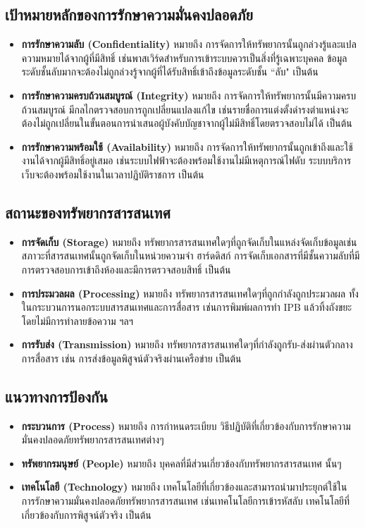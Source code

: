 \documentclass[../th_cyber_warfare_distilled.tex]{subfiles}
\begin{document}
\subsection{เป้าหมายหลักของการรักษาความมั่นคงปลอดภัย}
\begin{itemize}
	\item \textbf{การรักษาความลับ (Confidentiality)} หมายถึง การจัดการให้ทรัพยากรนั้นถูกล่วงรู้และแปลความหมายได้จากผู้ที่มีสิทธิ์ เช่นพาสเวิร์ดสำหรับการเข้าระบบควรเป็นสิ่งที่รู้เฉพาะบุคคล ข้อมูลระดับชั้นลับมากจะต้องไม่ถูกล่วงรู้จากผู้ที่ได้รับสิทธิ์เข้าถึงข้อมูลระดับชั้น ``ลับ" เป็นต้น
	\item \textbf{การรักษาความครบถ้วนสมบูรณ์ (Integrity)} หมายถึง การจัดการให้ทรัพยากรนั้นมีความครบถ้วนสมบูรณ์ มีกลไกตรวจสอบการถูกเปลี่ยนแปลงแก้ไข เช่นรายชื่อการแต่งตั้งดำรงตำแหน่งจะต้องไม่ถูกเปลี่ยนในขั้นตอนการนำเสนอผู้บังคับบัญชาจากผู้ไม่มีสิทธิ์โดยตรวจสอบไม่ได้ เป็นต้น
	\item \textbf{การรักษาความพร้อมใช้ (Availability)} หมายถึง การจัดการให้ทรัพยากรนั้นถูกเข้าถึงและใช้งานได้จากผู้มีสิทธิ์อยู่เสมอ เช่นระบบไฟฟ้าจะต้องพร้อมใช้งานไม่มีเหตุการณ์ไฟดับ ระบบบริการเว็บจะต้องพร้อมใช้งานในเวลาปฏิบัติราชการ เป็นต้น
\end{itemize}

\subsection{สถานะของทรัพยากรสารสนเทศ}
\begin{itemize}
	\item \textbf{การจัดเก็บ (Storage)} หมายถึง ทรัพยากรสารสนเทศใดๆที่ถูกจัดเก็บในแหล่งจัดเก็บข้อมูลเช่นสภาวะที่สารสนเทศนั้นถูกจัดเก็บในหน่วยความจำ ฮาร์ดดิสก์ การจัดเก็บเอกสารที่มีชั้นความลับที่มีการตรวจสอบการเข้าถึงห้องและมีการตรวจสอบสิทธิ์ เป็นต้น
	\item \textbf{การประมวลผล (Processing)} หมายถึง ทรัพยากรสารสนเทศใดๆที่ถูกกำลังถูกประมวลผล ทั้งในกระบวนการนอกระบบสารสนเทศและการสื่อสาร เช่นการพิมพ์ผลการทำ IPB แล้วทิ้งถังขยะโดยไม่มีการทำลายข้อความ ฯลฯ
	\item \textbf{การรับส่ง (Transmission)} หมายถึง ทรัพยากรสารสนเทศใดๆที่กำลังถูกรับ-ส่งผ่านตัวกลางการสื่อสาร เช่น การส่งข้อมูลพิสูจน์ตัวจริงผ่านเครือข่าย เป็นต้น
\end{itemize}

\subsection{แนวทางการป้องกัน}
\begin{itemize}
	\item \textbf{กระบวนการ (Process)} หมายถึง การกำหนดระเบียบ วิธีปฏิบัติที่เกี่ยวข้องกับการรักษาความมั่นคงปลอดภัยทรัพยากรสารสนเทศต่างๆ
	\item \textbf{ทรัพยากรมนุษย์ (People)} หมายถึง บุคคลที่มีส่วนเกี่ยวข้องกับทรัพยากรสารสนเทศ นั้นๆ
	\item \textbf{เทคโนโลยี (Technology)} หมายถึง เทคโนโลยีที่เกี่ยวข้องและสามารถนำมาประยุกต์ใช้ในการรักษาความมั่นคงปลอดภัยทรัพยากรสารสนเทศ เช่นเทคโนโลยีการเข้ารหัสลับ เทคโนโลยีที่เกี่ยวข้องกับการพิสูจน์ตัวจริง เป็นต้น
\end{itemize}
\end{document}
